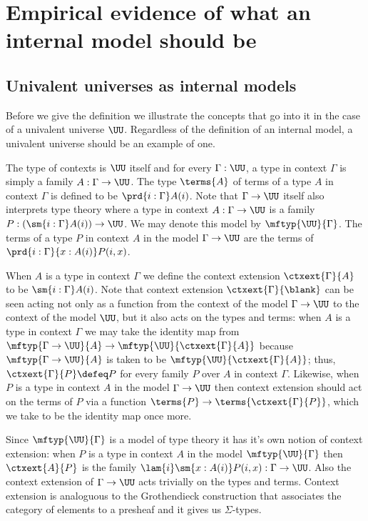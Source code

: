 \section{Empirical evidence of what an internal model should be}\label{eg}

\subsection{Univalent universes as internal models}

Before we give the definition we illustrate the concepts that go into it in
the case of a univalent universe $\UU$.
Regardless of the definition of an internal model, a univalent universe should
be an example of one.

The type of contexts is $\UU$ itself and for every $\Gamma:\UU$, a type in
context $\Gamma$ is simply a family $A:\Gamma\to\UU$. The type $\terms{A}$ of terms of a type $A$
in context $\Gamma$ is defined to be $\prd{i:\Gamma}A(i)$. Note that $\Gamma\to
\UU$ itself also interprets type theory where a type in context $A:\Gamma\to\UU$
is a family $P:(\sm{i:\Gamma}A(i))\to\UU$. We may denote this model by
$\mftyp{\UU}{\Gamma}$. The terms of a type $P$ in context $A$ in the model
$\Gamma\to\UU$ are the terms of $\prd{i:\Gamma}{x:A(i)}P(i,x)$.

When $A$ is a type in context
$\Gamma$ we define the context extension $\ctxext{\Gamma}{A}$ to be
$\sm{i:\Gamma}A(i)$. Note that context extension $\ctxext{\Gamma}{\blank}$
can be seen acting not only as a function from the context of the model
$\Gamma\to\UU$ to the context of the model $\UU$, but it also acts on the types 
and terms: when $A$ is a type in context $\Gamma$ we may take the identity map
from $\mftyp{\Gamma\to\UU}{A}\to\mftyp{\UU}{\ctxext{\Gamma}{A}}$ because
$\mftyp{\Gamma\to\UU}{A}$ is taken to be $\mftyp{\UU}{\ctxext{\Gamma}{A}}$;
thus, $\ctxext{\Gamma}{P}\defeq P$ for every family $P$ over $A$ in context 
$\Gamma$. Likewise, when $P$ is a type in context $A$ in the model 
$\Gamma\to\UU$ then context extension should act on the terms of $P$ via a
function $\terms{P}\to\terms{\ctxext{\Gamma}{P}}$, which we take to be
the identity map once more.

Since $\mftyp{\UU}{\Gamma}$ is a model of type theory it
has it's own notion of context extension: when $P$ is a type in context $A$ in
the model $\mftyp{\UU}{\Gamma}$ then $\ctxext{A}{P}$ is the family
$\lam{i}\sm{x:A(i)}P(i,x):\Gamma\to\UU$. Also the context extension of
$\Gamma\to\UU$ acts trivially on the types and terms. Context extension is
analoguous to the Grothendieck construction that associates the category of
elements to a presheaf and it gives us $\Sigma$-types.

